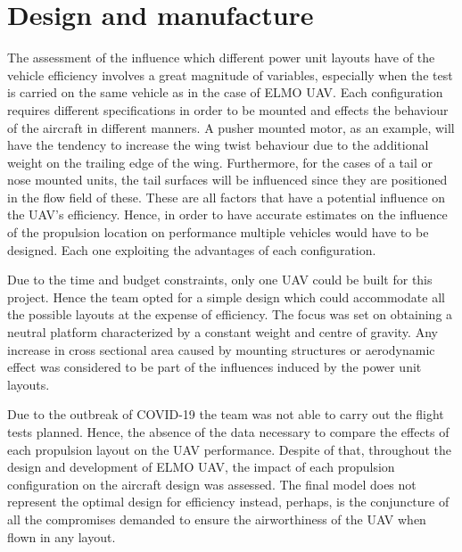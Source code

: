 \documentclass[../../main.tex]{subfiles}
\begin{document}

\section{Design and manufacture} \label{sec:project-review:design-and-manufacture}


The assessment of the influence which different power unit layouts have of the vehicle efficiency involves a great magnitude of variables, especially when the test is carried on the same vehicle as in the case of ELMO UAV.
Each configuration requires different specifications in order to be mounted and effects the behaviour of the aircraft in different manners.
A pusher mounted motor, as an example, will have the tendency to increase the wing twist behaviour due to the additional weight on the trailing edge of the wing.
Furthermore, for the cases of a tail or nose mounted units, the tail surfaces will be influenced since they are positioned in the flow field of these.
These are all factors that have a potential influence on the UAV’s efficiency.
Hence, in order to have accurate estimates on the influence of the propulsion location on performance multiple vehicles would have to be designed.
Each one exploiting the advantages of each configuration. 

Due to the time and budget constraints, only one UAV could be built for this project.
Hence the team opted for a simple design which could accommodate all the possible layouts at the expense of efficiency.
The focus was set on obtaining a neutral platform characterized by a constant weight and centre of gravity.
Any increase in cross sectional area caused by mounting structures or aerodynamic effect was considered to be part of the influences induced by the power unit layouts. 

Due to the outbreak of COVID-19 the team was not able to carry out the flight tests planned.
Hence, the absence of the data necessary to compare the effects of each propulsion layout on the UAV performance.
Despite of that, throughout the design and development of ELMO UAV, the impact of each propulsion configuration on the aircraft design was assessed.
The final model does not represent the optimal design for efficiency instead, perhaps, is the conjuncture of all the compromises demanded to ensure the airworthiness of the UAV when flown in any layout. 
\end{document}
